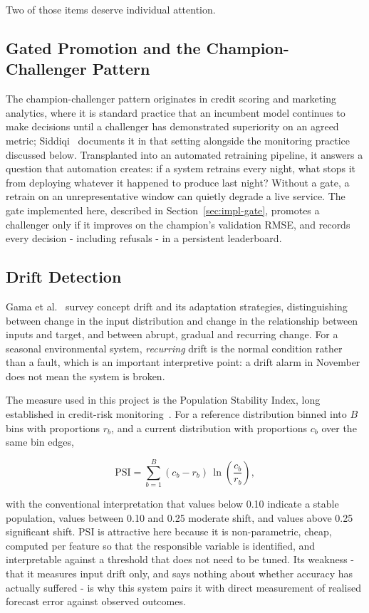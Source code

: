 Two of those items deserve individual attention.

\subsection{Gated Promotion and the Champion-Challenger Pattern}
The champion-challenger pattern originates in credit scoring and marketing
analytics, where it is standard practice that an incumbent model continues to
make decisions until a challenger has demonstrated superiority on an agreed
metric; Siddiqi~\cite{ref:siddiqi} documents it in that setting alongside the
monitoring practice discussed below. Transplanted into an automated retraining
pipeline, it answers a question that automation creates: if a system retrains
every night, what stops it from deploying whatever it happened to produce last
night? Without a gate, a retrain on an unrepresentative window can quietly
degrade a live service. The gate implemented here, described in
Section~\ref{sec:impl-gate}, promotes a challenger only if it improves on the
champion's validation RMSE, and records every decision - including refusals -
in a persistent leaderboard.

\subsection{Drift Detection}
Gama et al.~\cite{ref:driftsurvey} survey concept drift and its adaptation
strategies, distinguishing between change in the input distribution and change in
the relationship between inputs and target, and between abrupt, gradual and
recurring change. For a seasonal environmental system, \emph{recurring} drift is
the normal condition rather than a fault, which is an important interpretive
point: a drift alarm in November does not mean the system is broken.

The measure used in this project is the Population Stability Index, long
established in credit-risk monitoring~\cite{ref:siddiqi}. For a reference
distribution binned into $B$ bins with proportions $r_b$, and a current
distribution with proportions $c_b$ over the same bin edges,

\begin{equation}
\mathrm{PSI} = \sum_{b=1}^{B} (c_b - r_b)\,\ln\!\left(\frac{c_b}{r_b}\right),
\end{equation}

with the conventional interpretation that values below 0.10 indicate a stable
population, values between 0.10 and 0.25 moderate shift, and values above 0.25
significant shift. PSI is attractive here because it is non-parametric, cheap,
computed per feature so that the responsible variable is identified, and
interpretable against a threshold that does not need to be tuned. Its weakness -
that it measures input drift only, and says nothing about whether accuracy has
actually suffered - is why this system pairs it with direct measurement of
realised forecast error against observed outcomes.

